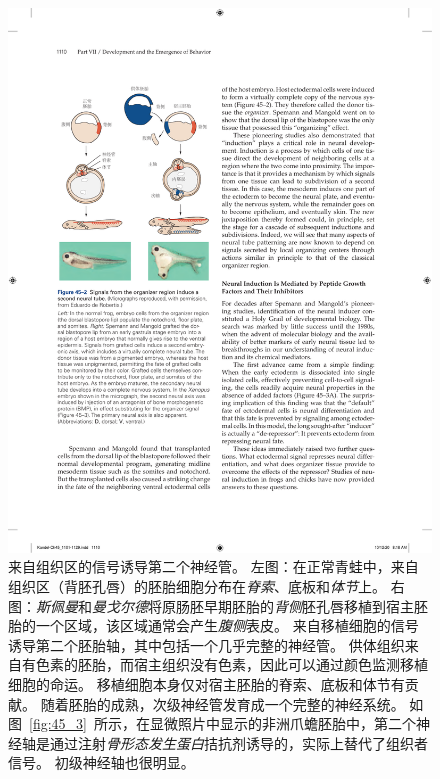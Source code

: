 \begin{figure}[htbp]
	\centering
	\includegraphics[width=0.62\linewidth]{chap45/fig_45_2}
	\caption{来自组织区的信号诱导第二个神经管。
		左图：在正常青蛙中，来自组织区（背胚孔唇）的胚胎细胞分布在\textit{脊索}、底板和\textit{体节}上。
		右图：\textit{斯佩曼}和\textit{曼戈尔德}将原肠胚早期胚胎的\textit{背侧}胚孔唇移植到宿主胚胎的一个区域，该区域通常会产生\textit{腹侧}表皮。
		来自移植细胞的信号诱导第二个胚胎轴，其中包括一个几乎完整的神经管。
		供体组织来自有色素的胚胎，而宿主组织没有色素，因此可以通过颜色监测移植细胞的命运。
		移植细胞本身仅对宿主胚胎的脊索、底板和体节有贡献。
		随着胚胎的成熟，次级神经管发育成一个完整的神经系统。
		如图~\ref{fig:45_3}~所示，在显微照片中显示的非洲爪蟾胚胎中，第二个神经轴是通过注射\textit{骨形态发生蛋白}拮抗剂诱导的，实际上替代了组织者信号。
		初级神经轴也很明显。}
	\label{fig:45_2}
\end{figure}


